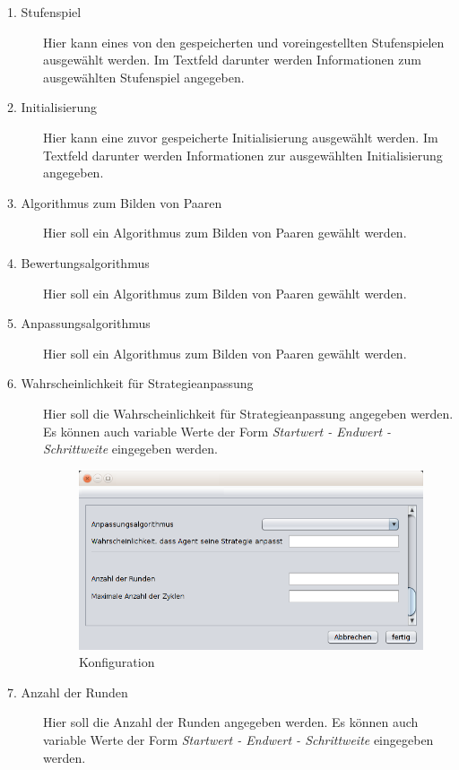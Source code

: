 \begin{description}

\item[1. Stufenspiel] Hier kann eines von den gespeicherten und voreingestellten Stufenspielen ausgewählt werden. Im Textfeld darunter werden Informationen zum ausgewählten Stufenspiel angegeben.

\item[2. Initialisierung] Hier kann eine zuvor gespeicherte Initialisierung ausgewählt werden. Im Textfeld darunter werden Informationen zur ausgewählten Initialisierung angegeben.

\item[3. Algorithmus zum Bilden von Paaren] Hier soll ein Algorithmus zum Bilden von Paaren gewählt werden. 

\item[4. Bewertungsalgorithmus] Hier soll ein Algorithmus zum Bilden von Paaren gewählt werden.

\item[5. Anpassungsalgorithmus] Hier soll ein Algorithmus zum Bilden von Paaren gewählt werden.

\item[6. Wahrscheinlichkeit für Strategieanpassung] Hier soll die Wahrscheinlichkeit für Strategieanpassung angegeben werden. Es können auch variable Werte der Form \textit{Startwert - Endwert - Schrittweite} eingegeben werden.

\begin{figure}[!h] 
  \centering
     \includegraphics[width=1.0\textwidth]{GUI_Entwurf/NeueKonfiguration2.png}
  \caption{Konfiguration}
  \label{fig:Bild2}
\end{figure}

\item[7. Anzahl der Runden] Hier soll die Anzahl der Runden angegeben werden. Es können auch variable Werte der Form \textit{Startwert - Endwert - Schrittweite} eingegeben werden.


\end{description}
